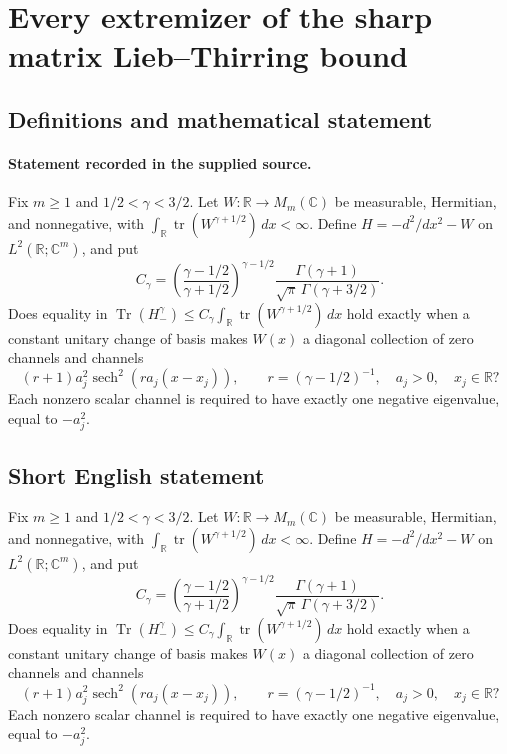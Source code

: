 \documentclass[11pt]{article}
\begin{document}
\section*{Every extremizer of the sharp matrix Lieb–Thirring bound}\label{statement}
\subsection{Definitions and mathematical statement}
\paragraph{Statement recorded in the supplied source.}
Fix $m\geq1$ and $1/2<\gamma<3/2$. Let $W:\mathbb R\to M_m(\mathbb C)$ be measurable, Hermitian, and nonnegative, with $\int_{\mathbb R}\operatorname{tr}(W^{\gamma+1/2})\,dx<\infty$. Define $H=-d^2/dx^2-W$ on $L^2(\mathbb R;\mathbb C^m)$, and put
\[C_\gamma=\left(\frac{\gamma-1/2}{\gamma+1/2}\right)^{\gamma-1/2}\frac{\Gamma(\gamma+1)}{\sqrt\pi\,\Gamma(\gamma+3/2)}.\]
Does equality in $\operatorname{Tr}(H_-^\gamma)\leq C_\gamma\int_{\mathbb R}\operatorname{tr}(W^{\gamma+1/2})\,dx$ hold exactly when a constant unitary change of basis makes $W(x)$ a diagonal collection of zero channels and channels
\[(r+1)a_j^2\operatorname{sech}^2(r a_j(x-x_j)),\qquad r=(\gamma-1/2)^{-1},\quad a_j>0,\quad x_j\in\mathbb R?\]
Each nonzero scalar channel is required to have exactly one negative eigenvalue, equal to $-a_j^2$.
\subsection{Short English statement}
Fix $m\geq1$ and $1/2<\gamma<3/2$. Let $W:\mathbb R\to M_m(\mathbb C)$ be measurable, Hermitian, and nonnegative, with $\int_{\mathbb R}\operatorname{tr}(W^{\gamma+1/2})\,dx<\infty$. Define $H=-d^2/dx^2-W$ on $L^2(\mathbb R;\mathbb C^m)$, and put
\[C_\gamma=\left(\frac{\gamma-1/2}{\gamma+1/2}\right)^{\gamma-1/2}\frac{\Gamma(\gamma+1)}{\sqrt\pi\,\Gamma(\gamma+3/2)}.\]
Does equality in $\operatorname{Tr}(H_-^\gamma)\leq C_\gamma\int_{\mathbb R}\operatorname{tr}(W^{\gamma+1/2})\,dx$ hold exactly when a constant unitary change of basis makes $W(x)$ a diagonal collection of zero channels and channels
\[(r+1)a_j^2\operatorname{sech}^2(r a_j(x-x_j)),\qquad r=(\gamma-1/2)^{-1},\quad a_j>0,\quad x_j\in\mathbb R?\]
Each nonzero scalar channel is required to have exactly one negative eigenvalue, equal to $-a_j^2$.
\end{document}
